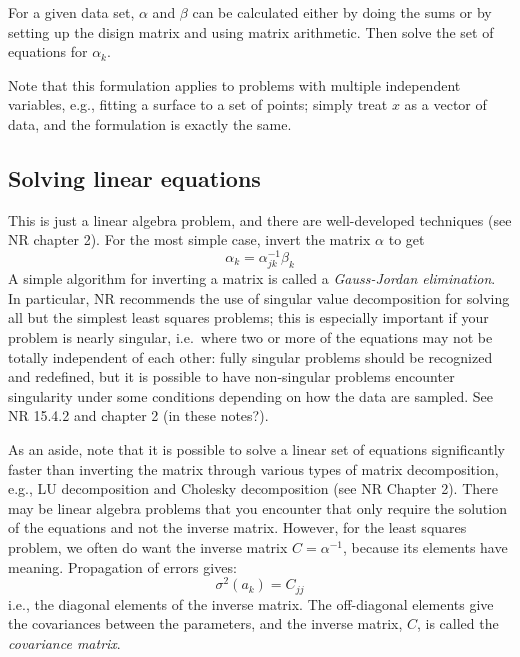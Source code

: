 \documentclass{article}
\begin{document}
For a given data set, $\alpha$ and $\beta$ can be calculated either
by doing the sums or by setting up the disign matrix and using matrix
arithmetic. Then solve the set of equations for $\alpha_k$.

Note that this formulation applies to problems with multiple
independent variables, e.g., fitting a surface to a set of points;
simply treat $x$ as a vector of data, and the formulation is exactly
the same.

\subsection{Solving linear equations}

This is just a linear algebra problem, and there are well-developed techniques
(see NR chapter 2). For the most simple case, invert the matrix $\alpha$ to get
$$ \alpha_k = \alpha_{jk}^{-1}\beta_k
$$
A simple algorithm for inverting a matrix is called a \emph{Gauss-Jordan
elimination}. In particular, NR recommends the use of singular value
decomposition for solving all but the simplest least squares problems; this is
especially important if your problem is nearly singular, i.e.\ where two or
more of the equations may not be totally independent of each other: fully
singular problems should be recognized and redefined, but it is possible to
have non-singular problems encounter singularity under some conditions
depending on how the data are sampled. See NR 15.4.2 and chapter 2 (in these
notes?).

As an aside, note that it is possible to solve a linear set of equations
significantly faster than inverting the matrix through various types of
matrix decomposition, e.g., LU decomposition and Cholesky decomposition
(see NR Chapter 2). There may be linear algebra problems that you
encounter that only require the solution of the equations and not the
inverse matrix. However, for the least squares problem, we often
do want the inverse matrix $C = \alpha^{-1}$, because its elements
have meaning. Propagation of errors gives:
$$ \sigma^{2}(a_{k}) = C_{jj}
$$
i.e., the diagonal elements of the inverse matrix. The off-diagonal
elements give the covariances between the parameters, and the inverse
matrix, $C$, is called the \emph{covariance matrix}.
\end{document}
